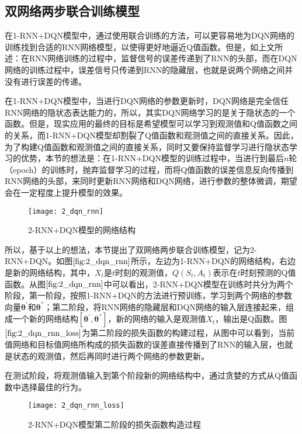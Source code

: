 \subsection{双网络两步联合训练模型}
在1-RNN+DQN模型中，通过使用联合训练的方法，可以更容易地为DQN网络的训练找到合适的RNN网络模型，以使得更好地逼近Q值函数。但是，如上文所述：在RNN网络训练的过程中，监督信号的误差传递到了RNN的头部，而在DQN网络的训练过程中，误差信号只传递到RNN的隐藏层，也就是说两个网络之间并没有进行误差的传递。

在1-RNN+DQN模型中，当进行DQN网络的参数更新时，DQN网络是完全信任RNN网络的隐状态表达能力的，所以，其实DQN网络学习的是关于隐状态的一个函数。但是，现实应用的最终的目标是希望模型可以学习到观测值和Q值函数之间的关系，而1-RNN+DQN模型却割裂了Q值函数和观测值之间的直接关系。因此，为了构建Q值函数和观测值之间的直接关系，同时又要保持监督学习进行隐状态学习的优势，本节的想法是：在1-RNN+DQN模型的训练过程中，当进行到最后$n$轮（epoch）的训练时，抛弃监督学习的过程，而将Q值函数的误差信息反向传播到RNN网络的头部，来同时更新RNN网络和DQN网络，进行参数的整体微调，期望会在一定程度上提升模型的效果。

\begin{figure}[htbp]
\centering
\texttt{[image: 2\_dqn\_rnn]}
\caption{2-RNN+DQN模型的网络结构}
\label{fig:2_dqn_rnn}
\end{figure}

所以，基于以上的想法，本节提出了双网络两步联合训练模型，记为2-RNN+DQN。如图$\ref{fig:2_dqn_rnn}$所示，左边为1-RNN+DQN的网络结构，右边是新的网络结构，其中，$X_{t}$是$t$时刻的观测值，$Q(S_{t},A_{t})$表示在$t$时刻预测的Q值函数。从图$\ref{fig:2_dqn_rnn}$中可以看出，2-RNN+DQN模型在训练时共分为两个阶段，第一阶段，按照1-RNN+DQN的方法进行预训练，学习到两个网络的参数向量$\bm{\theta}^{'}$和$\bm{\theta}^{''}$；第二阶段，将RNN网络的隐藏层和DQN网络的输入层连接起来，组成一个新的网络结构$[\bm{\theta}^{'},\bm{\theta}^{''}]$，新的网络的输入是观测值$X_{t}$，输出是Q函数。图$\ref{fig:2_dqn_rnn_loss}$为第二阶段的损失函数的构建过程，从图中可以看到，当前值网络和目标值网络所构成的损失函数的误差直接传播到了RNN的输入层，也就是状态的观测值，然后再同时进行两个网络的参数更新。

在测试阶段，将观测值输入到第个阶段新的网络结构中，通过贪婪的方式从Q值函数中选择最佳的行为。


\begin{figure}[htbp]
\centering
\texttt{[image: 2\_dqn\_rnn\_loss]}
\caption{2-RNN+DQN模型第二阶段的损失函数构造过程}
\label{fig:2_dqn_rnn_loss}
\end{figure}

